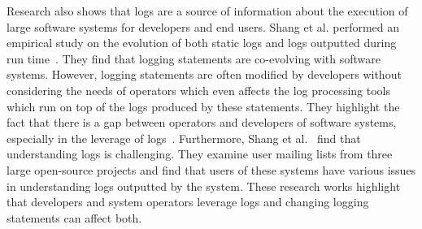 Research also shows that logs are a source of information about the execution of large software systems for developers and end users. Shang et al. performed an empirical study on the evolution of both static logs and logs outputted during run time~\cite{EMSEIAN,PaperIanCIIII}. They find that logging statements are co-evolving with software systems. However, logging statements are often modified by developers without considering the needs of operators which even affects the log processing tools which run on top of the logs produced by these statements. They highlight the fact that there is a gap between operators and developers of software systems, especially in the leverage of logs~\cite{IanGap}. Furthermore, Shang et al.~\cite{IanIcesm} find that understanding logs is challenging. They examine user mailing lists from three large open-source projects and find that users of these systems have various issues in understanding logs outputted by the system. These research works highlight that developers and system operators leverage logs and changing logging statements can affect both.

